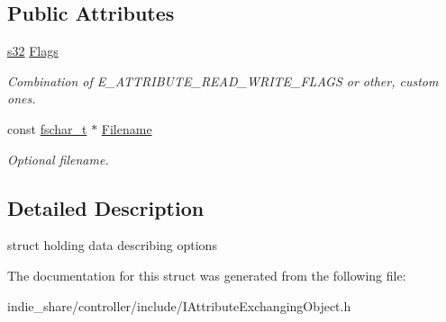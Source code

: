\subsection*{Public Attributes}
\begin{DoxyCompactItemize}
\item 
\mbox{\label{structirr_1_1io_1_1SAttributeReadWriteOptions_a3982d8ac06deb65d238e1c0d693e1f8c}} 
\hyperlink{namespaceirr_ac66849b7a6ed16e30ebede579f9b47c6}{s32} \hyperlink{structirr_1_1io_1_1SAttributeReadWriteOptions_a3982d8ac06deb65d238e1c0d693e1f8c}{Flags}
\begin{DoxyCompactList}\small\item\em Combination of E\+\_\+\+A\+T\+T\+R\+I\+B\+U\+T\+E\+\_\+\+R\+E\+A\+D\+\_\+\+W\+R\+I\+T\+E\+\_\+\+F\+L\+A\+GS or other, custom ones. \end{DoxyCompactList}\item 
\mbox{\label{structirr_1_1io_1_1SAttributeReadWriteOptions_a34bf85f1040bc6f6ec7ab15f41d76518}} 
const \hyperlink{namespaceirr_a813cca9bac9fa0c1427d89720a451460}{fschar\+\_\+t} $\ast$ \hyperlink{structirr_1_1io_1_1SAttributeReadWriteOptions_a34bf85f1040bc6f6ec7ab15f41d76518}{Filename}
\begin{DoxyCompactList}\small\item\em Optional filename. \end{DoxyCompactList}\end{DoxyCompactItemize}


\subsection{Detailed Description}
struct holding data describing options 

The documentation for this struct was generated from the following file\+:\begin{DoxyCompactItemize}
\item 
indie\+\_\+share/controller/include/I\+Attribute\+Exchanging\+Object.\+h\end{DoxyCompactItemize}
